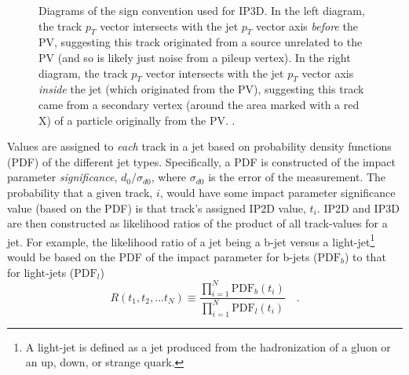             \begin{figure}
                \caption{
                    Diagrams of the sign convention used for IP3D.
                    In the left diagram, the track $p_T$ vector intersects with the jet $p_T$ vector axis
                        \textit{before} the PV, suggesting this track originated from a source unrelated to the PV
                        (and so is likely just noise from a pileup vertex).
                    In the right diagram, the track $p_T$ vector intersects with the jet $p_T$ vector axis
                        \textit{inside} the jet (which originated from the PV),
                        suggesting this track came from a secondary vertex
                        (around the area marked with a red X)
                        of a particle originally from the PV.
                    \cite{thesis_giacinto}.
                }
                \label{fig:ip3d_sign}
            \end{figure}

            Values are assigned to \textit{each} track in a jet based on probability density functions (PDF) of the different jet types.
            Specifically, a PDF is constructed of the impact parameter \textit{significance}, $d_0/\sigma_{d0}$,
                where $\sigma_{d0}$ is the error of the measurement.
            The probability that a given track, $i$, would have some impact parameter significance value (based on the PDF)
                is that track's assigned IP2D value, $t_i$.
            IP2D and IP3D are then constructed as likelihood ratios of the product of all track-values for a jet.
            For example, the likelihood ratio of a jet being a b-jet versus a light-jet\footnote{
                    A light-jet is defined as a jet produced from the hadronization of a gluon or
                        an up, down, or strange quark.}
                would be based on the PDF of the impact parameter for
                b-jets ($\textrm{PDF}_b$) to that for light-jets ($\textrm{PDF}_l$)
            \begin{equation}
                R(t_1, t_2, ... t_N) \equiv \frac{\prod_{i=1}^N \textrm{PDF}_b(t_i)}{\prod_{i=1}^N \textrm{PDF}_l(t_i)}
                \quad.
            \end{equation}

